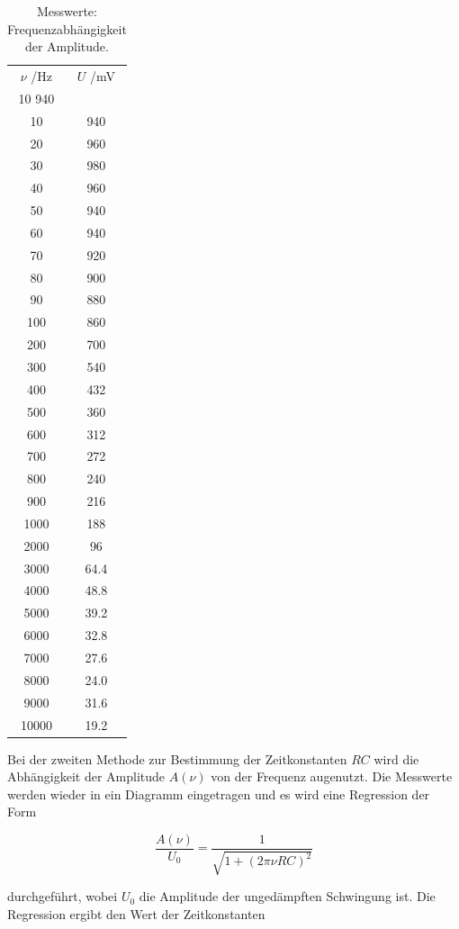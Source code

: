 \begin{table}
  \centering
  \caption{Messwerte: Frequenzabhängigkeit der Amplitude.}
  \label{table2}
  \begin{tabular}{c c}
    \toprule
    $\nu$ /Hz & $U$ /mV \\10  940\\
    \midrule
    10 & 940\\
    20 & 960\\
    30 & 980\\
    40 & 960\\
    50 & 940\\
    60 & 940\\
    70 & 920\\
    80 & 900\\
    90 & 880\\
    100 & 860\\
    200 & 700\\
    300 & 540\\
    400 & 432\\
    500 & 360\\
    600 & 312\\
    700 & 272\\
    800 & 240\\
    900 & 216\\
    1000 & 188 \\
    2000 & 96\\
    3000 & 64.4\\
    4000 & 48.8\\
    5000 & 39.2\\
    6000 & 32.8\\
    7000 & 27.6\\
    8000 & 24.0\\
    9000 & 31.6\\
    10000 &  19.2\\
    \bottomrule
  \end{tabular}
\end{table}

Bei der zweiten Methode zur Bestimmung der Zeitkonstanten $RC$ wird die Abhängigkeit der
Amplitude $A(\nu)$ von der Frequenz augenutzt. Die Messwerte werden wieder in ein Diagramm eingetragen
und es wird eine Regression der Form

\begin{equation*}
  \frac{A(\nu)}{U_0} = \frac{1}{\sqrt{1+(2 \pi \nu RC)^2}}
\end{equation*}

durchgeführt, wobei $U_0$ die Amplitude der ungedämpften Schwingung ist.
Die Regression ergibt den Wert der Zeitkonstanten

